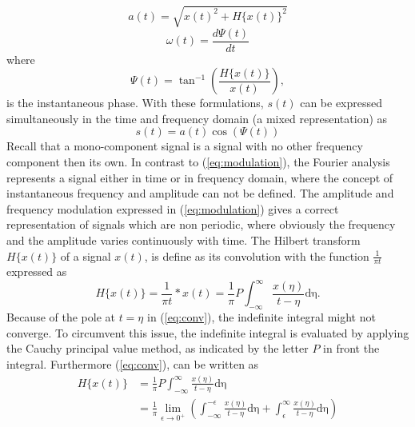 \documentclass[../Main/thesis.tex]{subfiles}
\begin{document}
\begin{equation}\label{eq:amplitude}
a(t) = \sqrt{x(t)^{2} + H\{x(t) \}^{2} }
\end{equation}
\begin{equation}\label{eq:frequency}
\omega(t) = \frac{d \Psi(t)}{dt} 
\end{equation}
where 
\begin{equation}\label{eq:frequency}
\Psi(t) = \tan^{-1}\left(\frac{H\{x(t) \}}{x(t)} \right),
\end{equation}
is the instantaneous phase. With these formulations, $s(t)$ can be expressed simultaneously in the time and frequency domain (a mixed representation) as 
\begin{equation}\label{eq:modulation}
s(t) = a(t)\cos\left( \Psi(t)\right) 
\end{equation}
Recall that a mono-component signal is a signal with no other frequency component then its own.
In contrast to (\ref{eq:modulation}), the Fourier analysis represents a signal either in time or in frequency domain, where the concept of instantaneous frequency and amplitude can not be defined. The amplitude and frequency modulation expressed in (\ref{eq:modulation}) gives a correct representation of signals which are non periodic, where obviously the frequency and the amplitude varies continuously with time.
\justify
The Hilbert transform $H\{ x(t) \}$ of a signal $x(t)$, is define as its convolution with the function $\frac{1}{\pi t}$ expressed as
\begin{equation}\label{eq:conv}
H\{ x(t) \} = \frac{1}{\pi t}* x(t) = 	\frac{1}{\pi}P \int_{-\infty}^{\infty}\frac{x(\eta)}{t-\eta}\mathrm{d\eta}.
\end{equation}
Because of the pole at $t=\eta$ in (\ref{eq:conv}), the indefinite integral might not converge. To circumvent this issue, the indefinite integral is evaluated by applying the Cauchy principal value method, as indicated by the letter $P$ in front the integral. Furthermore (\ref{eq:conv}), can be written as
\begin{equation}
\begin{split}
H\{ x(t) \} &=  \frac{1}{\pi}P \int_{-\infty}^{\infty}\frac{x(\eta)}{t-\eta}\mathrm{d\eta}\\
&= \frac{1}{\pi}\lim_{\epsilon\rightarrow 0^{+}} \left( \int_{-\infty}^{-\epsilon} \frac{x(\eta)}{t-\eta}\mathrm{d\eta} +   \int_{\epsilon}^{\infty} \frac{x(\eta)}{t-\eta}\mathrm{d\eta}     \right)
\end{split}
\end{equation}
\end{document}
